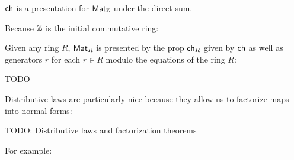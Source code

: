 \begin{lemma}
${\sf ch}$ is a presentation for $\mathsf{Mat}_{\mathbb{Z}}$ under the direct sum.
\end{lemma}

Because $\mathbb{Z}$ is the initial commutative ring:
\begin{lemma}
Given any ring $R$, $\mathsf{Mat}_R$ is presented by the prop ${\sf ch}_R$ given by ${\sf ch}$ as well as generators $r$ for each $r \in R$ modulo the equations of the ring $R$:

TODO
\end{lemma}

Distributive laws are particularly nice because they allow us to factorize maps into normal forms:
\begin{lemma}
\label{lem:distfact}
TODO: Distributive laws and factorization theorems
\end{lemma}


For example:

